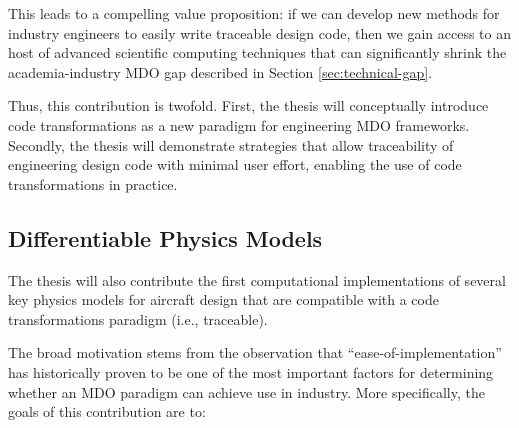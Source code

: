 \documentclass[12pt,vi,oneside]{report}
\begin{document}
\begin{table}[H]

    \end{table}

    This leads to a compelling value proposition: if we can develop new methods for industry engineers to easily write traceable design code, then we gain access to an host of advanced scientific computing techniques that can significantly shrink the academia-industry MDO gap described in Section \ref{sec:technical-gap}.

    Thus, this contribution is twofold. First, the thesis will conceptually introduce code transformations as a new paradigm for engineering MDO frameworks. Secondly, the thesis will demonstrate strategies that allow traceability of engineering design code with minimal user effort, enabling the use of code transformations in practice.

    \subsection{Differentiable Physics Models}

    The thesis will also contribute the first computational implementations of several key physics models for aircraft design that are compatible with a code transformations paradigm (i.e., traceable).

    The broad motivation stems from the observation that ``ease-of-implementation'' has historically proven to be one of the most important factors for determining whether an MDO paradigm can achieve use in industry. More specifically, the goals of this contribution are to:
\end{document}
